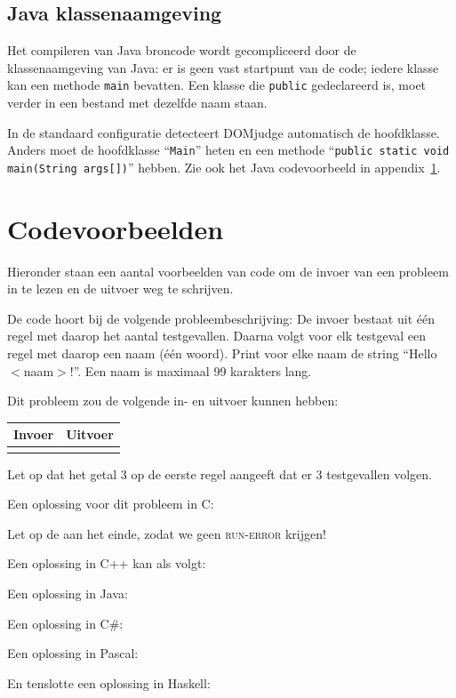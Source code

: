 \subsection{Java klassenaamgeving}

Het compileren van Java broncode wordt gecompliceerd door de
klassenaamgeving van Java: er is geen vast startpunt van de code;
iedere klasse kan een methode \texttt{main} bevatten. Een klasse die
\texttt{public} gedeclareerd is, moet verder in een bestand met
dezelfde naam staan.

In de standaard configuratie detecteert DOMjudge automatisch de
hoofdklasse. Anders moet de hoofdklasse ``\verb!Main!'' heten en een
methode ``\verb!public static void main(String args[])!'' hebben. Zie
ook het Java codevoorbeeld in appendix~\ref{codeexamples}.

\newpage
\appendix

\section{Codevoorbeelden}\label{codeexamples}

Hieronder staan een aantal voorbeelden van code om de invoer van een
probleem in te lezen en de uitvoer weg te schrijven.

De code hoort bij de volgende probleembeschrijving: 
De invoer bestaat uit \'e\'en regel met daarop het aantal testgevallen.
Daarna volgt voor elk testgeval een regel met daarop een naam (\'e\'en
woord). Print voor elke naam de string ``Hello $<$naam$>$!''. Een naam
is maximaal 99 karakters lang.

Dit probleem zou de volgende in- en uitvoer kunnen hebben:

\begin{tabular}{|p{}|p{}|}
\hline
\textbf{Invoer} & \textbf{Uitvoer} \\
\hline
 &
 \\
\hline
\end{tabular}

Let op dat het getal 3 op de eerste regel aangeeft dat er 3
testgevallen volgen.

Een oplossing voor dit probleem in C:

Let op de  aan het einde, zodat we geen
\textsc{run-error} krijgen!

\newpage

Een oplossing in C++ kan als volgt:

Een oplossing in Java:

\newpage

Een oplossing in C\#:

Een oplossing in Pascal:

En tenslotte een oplossing in Haskell:


